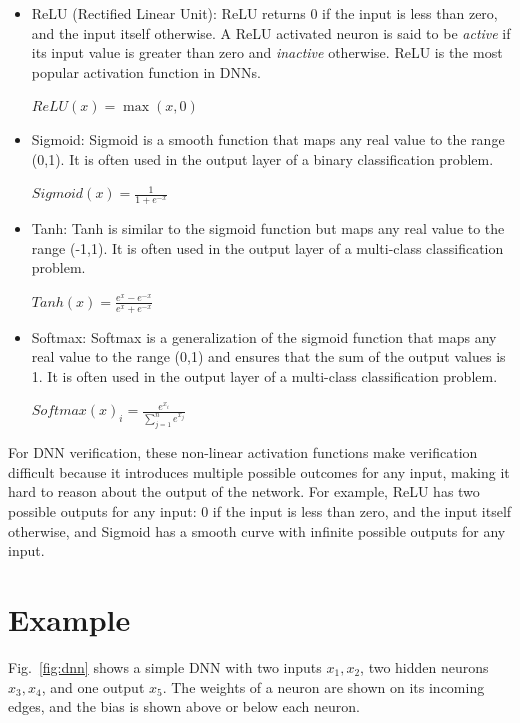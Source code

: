 \documentclass[oneside,11pt,dvipsnames]{book}
\begin{document}
\begin{itemize}
\item ReLU (Rectified Linear Unit):  ReLU returns 0 if the input is less than zero, and the input itself otherwise. 
A ReLU activated neuron is said to be \emph{active} if its input value is greater than zero and \emph{inactive} otherwise.
ReLU is the most popular activation function in DNNs.\\
    \begin{center}
        $ReLU(x) = \max(x,0)$
    \end{center}


    
    
\item Sigmoid: Sigmoid is a smooth function that maps any real value to the range (0,1). It is often used in the output layer of a binary classification problem.\\
    \begin{center}
        $Sigmoid(x) = \frac{1}{1+e^{-x}}$
    \end{center}
\item Tanh: Tanh is similar to the sigmoid function but maps any real value to the range (-1,1). It is often used in the output layer of a multi-class classification problem.\\
    \begin{center}
        $Tanh(x) = \frac{e^x-e^{-x}}{e^x+e^{-x}}$
    \end{center}
\item Softmax: Softmax is a generalization of the sigmoid function that maps any real value to the range (0,1) and ensures that the sum of the output values is 1. It is often used in the output layer of a multi-class classification problem.\\
    \begin{center}
    $Softmax(x)_i = \frac{e^{x_i}}{\sum_{j=1}^{n}e^{x_j}}$
    \end{center}
\end{itemize}

For DNN verification, these non-linear activation functions make verification difficult because it introduces multiple possible outcomes for any input, making it hard to reason about the output of the network. For example, ReLU has two possible outputs for any input: 0 if the input is less than zero, and the input itself otherwise, and Sigmoid has a smooth curve with infinite possible outputs for any input.


\section{Example} 
Fig.~\ref{fig:dnn} shows a simple DNN with two inputs $x_1,x_2$, two hidden neurons $x_3,x_4$, and one output $x_5$. The weights of a neuron are shown on its incoming edges, and the bias is shown above or below each neuron. 
\end{document}
